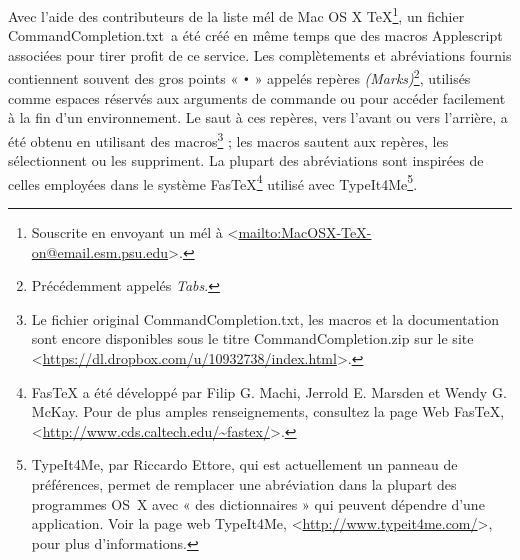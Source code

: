 \documentclass[11pt,french]{article}
\newcommand{\fastex}{Fas\hspace{-.15em}\TeX}
\newcommand{\CCT}{\textsf{CommandCompletion.txt}}
\begin{document}
Avec l'aide des contributeurs de la liste mél de \textsf{Mac OS X TeX}\footnote{Souscrite en envoyant un mél à <\url{mailto:MacOSX-TeX-on@email.esm.psu.edu}>.}, un fichier \CCT\ a été créé en même temps que des macros Applescript associées pour tirer profit de ce service. Les complètements et abréviations fournis contiennent souvent des gros points « \texttt{•} » appelés repères \emph{(Marks)}\footnote{Précédemment appelés \emph{Tabs}.}, utilisés comme espaces réservés aux arguments de commande ou pour accéder facilement à la fin d'un environnement. Le saut à ces repères, vers l'avant ou vers l'arrière, a été obtenu en utilisant des macros\footnote{Le fichier original \CCT, les macros et la documentation sont encore disponibles sous le titre \textsf{CommandCompletion.zip} sur le site <\url{https://dl.dropbox.com/u/10932738/index.html}>.} ; les macros sautent aux 
repères, les sélectionnent ou les suppriment. La plupart des abréviations sont inspirées de celles employées dans le système \textsf{\fastex}\footnote{\textsf{\fastex} a été développé par Filip G. Machi, Jerrold E. Marsden et Wendy G. McKay. Pour de plus amples renseignements, consultez la page Web \textsf{\fastex}, <\url{http://www.cds.caltech.edu/~fastex/}>.} utilisé avec \textsf{TypeIt4Me}\footnote{\textsf{TypeIt4Me}, par Riccardo Ettore, qui 
est actuellement un panneau de préférences, permet de remplacer une abréviation dans la plupart des programmes 
OS~X avec « des dictionnaires » qui peuvent dépendre d'une application. Voir la page web \textsf{TypeIt4Me}, <\url{http://www.typeit4me.com/}>, pour plus d'informations.}.

\end{document}
